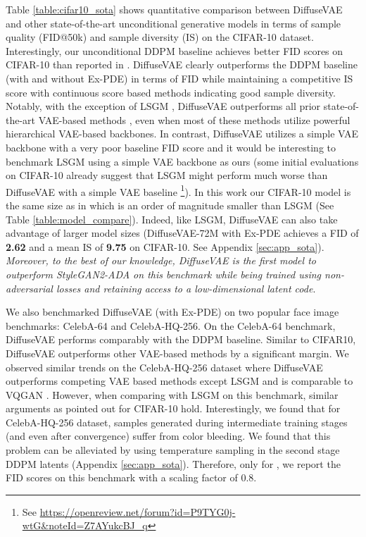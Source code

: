\documentclass[10pt]{article} \usepackage[accepted]{tmlr}
\begin{document}
Table \ref{table:cifar10_sota} shows quantitative comparison between DiffuseVAE and other state-of-the-art unconditional generative models in terms of sample quality (FID@50k) and sample diversity (IS) on the CIFAR-10 dataset. Interestingly, our unconditional DDPM baseline achieves better FID scores on CIFAR-10 than reported in \citep{ho2020denoising}. DiffuseVAE clearly outperforms the DDPM baseline (with and without Ex-PDE) in terms of FID while maintaining a competitive IS score with continuous score based methods indicating good sample diversity. Notably, with the exception of LSGM \citep{vahdat2021scorebased}, DiffuseVAE outperforms all prior state-of-the-art VAE-based methods \citep{vahdat2021nvae,xiao2021vaebm,sinha2021d2c}, even when most of these methods utilize powerful hierarchical VAE-based backbones. In contrast, DiffuseVAE utilizes a simple VAE backbone with a very poor baseline FID score and it would be interesting to benchmark LSGM using a simple VAE backbone as ours (some initial evaluations on CIFAR-10 already suggest that LSGM might perform much worse than DiffuseVAE with a simple VAE baseline \footnote{See \url{https://openreview.net/forum?id=P9TYG0j-wtG&noteId=Z7AYukcBJ_q}}). In this work our CIFAR-10 model is the same size as in \citep{ho2020denoising} which is an order of magnitude smaller than LSGM (See Table \ref{table:model_compare}). Indeed, like LSGM, DiffuseVAE can also take advantage of larger model sizes (DiffuseVAE-72M with Ex-PDE achieves a FID of \textbf{2.62} and a mean IS of \textbf{9.75} on CIFAR-10. See Appendix \ref{sec:app_sota}). \textit{Moreover, to the best of our knowledge, DiffuseVAE is the first model to outperform StyleGAN2-ADA \citep{https://doi.org/10.48550/arxiv.2006.06676} on this benchmark while being trained using non-adversarial losses and retaining access to a low-dimensional latent code}.

We also benchmarked DiffuseVAE (with Ex-PDE) on two popular face image benchmarks: CelebA-64 and CelebA-HQ-256. On the CelebA-64 benchmark, DiffuseVAE performs comparably with the DDPM baseline. Similar to CIFAR10, DiffuseVAE outperforms other VAE-based methods \citep{sinha2021d2c, Aneja2020NCPVAEVA, xiao2021vaebm} by a significant margin. We observed similar trends on the CelebA-HQ-256 dataset where DiffuseVAE outperforms competing VAE based methods except LSGM and is comparable to VQGAN \citep{https://doi.org/10.48550/arxiv.2012.09841}. However, when comparing with LSGM on this benchmark, similar arguments as pointed out for CIFAR-10 hold. Interestingly, we found that for CelebA-HQ-256 dataset, samples generated during intermediate training stages (and even after convergence) suffer from color bleeding. We found that this problem can be alleviated by using temperature sampling in the second stage DDPM latents (Appendix \ref{sec:app_sota}). Therefore, only for , we report the FID scores on this benchmark with a scaling factor of 0.8.
\end{document}
